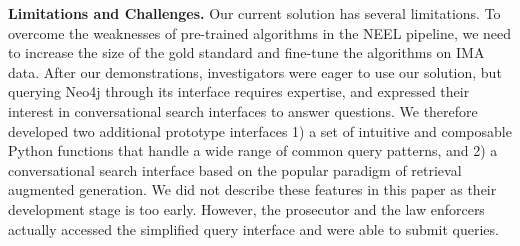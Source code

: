 \textbf{Limitations and Challenges.}
Our current solution has several limitations. To overcome the weaknesses of pre-trained algorithms in the NEEL pipeline, we need to increase the size of the gold standard and fine-tune the algorithms on IMA data. %
%
After our demonstrations, investigators were eager to use our solution, but querying Neo4j through its interface requires expertise, and expressed their interest in conversational search interfaces to answer questions. We therefore developed two additional prototype interfaces 1) a set of intuitive and composable Python functions that handle a wide range of common query patterns,
and 2) a conversational search interface based on the popular paradigm of retrieval augmented generation. We did not describe these features in this paper as their development stage is too early. However, the prosecutor and the law enforcers actually accessed the simplified query interface and were able to submit queries.    
